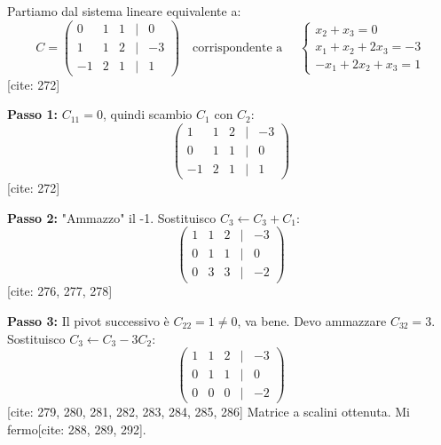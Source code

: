 \documentclass[11pt,a4paper]{article}
\begin{document}
\begin{esercizio}
Partiamo dal sistema lineare equivalente a:
$$
C = \begin{pmatrix}
0 & 1 & 1 & | & 0 \\
1 & 1 & 2 & | & -3 \\
-1 & 2 & 1 & | & 1
\end{pmatrix} \quad \text{corrispondente a } \quad
\begin{cases}
x_2 + x_3 = 0 \\
x_1 + x_2 + 2x_3 = -3 \\
-x_1 + 2x_2 + x_3 = 1
\end{cases}
$$
[cite: 272]

\textbf{Passo 1:} $C_{11} = 0$, quindi scambio $C_1$ con $C_2$:
$$
\begin{pmatrix}
1 & 1 & 2 & | & -3 \\
0 & 1 & 1 & | & 0 \\
-1 & 2 & 1 & | & 1
\end{pmatrix}
$$
[cite: 272]

\textbf{Passo 2:} "Ammazzo" il -1. Sostituisco $C_3 \leftarrow C_3 + C_1$:
$$
\begin{pmatrix}
1 & 1 & 2 & | & -3 \\
0 & 1 & 1 & | & 0 \\
0 & 3 & 3 & | & -2
\end{pmatrix}
$$
[cite: 276, 277, 278]

\textbf{Passo 3:} Il pivot successivo è $C_{22} = 1 \neq 0$, va bene. Devo ammazzare $C_{32} = 3$. Sostituisco $C_3 \leftarrow C_3 - 3C_2$:
$$
\begin{pmatrix}
1 & 1 & 2 & | & -3 \\
0 & 1 & 1 & | & 0 \\
0 & 0 & 0 & | & -2
\end{pmatrix}
$$
[cite: 279, 280, 281, 282, 283, 284, 285, 286]
Matrice a scalini ottenuta. Mi fermo[cite: 288, 289, 292].
\end{esercizio}
\end{document}
